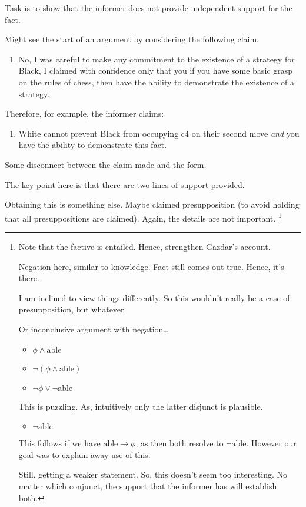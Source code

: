 \documentclass[10pt]{article}
\begin{document}
Task is to show that the informer does not provide independent support for the fact.

Might see the start of an argument by considering the following claim.

\begin{enumerate}
\item\label{i:claim:exist} No, I was careful to make any commitment to the existence of a strategy for Black, I claimed with confidence only that you if you have some basic grasp on the rules of chess, then have the ability to demonstrate the existence of a strategy.
\end{enumerate}

Therefore, for example, the informer claims:
\begin{enumerate}
\item\label{chess:claim:1:conj} White cannot prevent Black from occupying c4 on their second move \emph{and} you have the ability to demonstrate this fact.
\end{enumerate}

Some disconnect between the claim made and the form.

{
  \color{red}
  The key point here is that there are two lines of support provided.
}

Obtaining this is something else.
Maybe claimed presupposition (to avoid holding that all presuppositions are claimed).
Again, the details are not important.\nolinebreak
\footnote{
  Note that the factive is entailed.
  Hence, strengthen Gazdar's account.

  Negation here, similar to knowledge.
  Fact still comes out true.
  Hence, it's there.

  I am inclined to view things differently.
  So this wouldn't really be a case of presupposition, but whatever.

  Or inconclusive argument with negation\dots

  \begin{itemize}
  \item \(\phi \land \text{able}\)
  \item \(\lnot(\phi \land \text{able})\)
  \item \(\lnot\phi \lor \lnot\text{able}\)
  \end{itemize}
  This is puzzling.
  As, intuitively only the latter disjunct is plausible.
  \begin{itemize}
  \item \(\lnot\text{able}\)
  \end{itemize}
  This follows if we have \(\text{able} \rightarrow \phi\), as then both resolve to \(\lnot\text{able}\).
  However our goal was to explain away use of this.

  Still, getting a weaker statement.
  So, this doesn't seem too interesting.
  No matter which conjunct, the support that the informer has will establish both.
}
\end{document}
